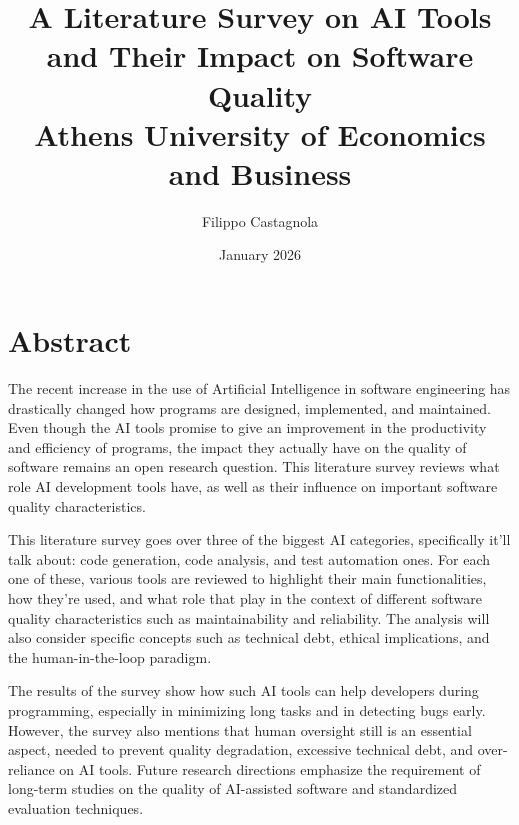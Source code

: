 \documentclass{report}
\title{\textbf{A Literature Survey on AI Tools and Their Impact on Software Quality}\\

{\Large Athens University of Economics and Business}}
\author{Filippo Castagnola}
\date{January 2026}
\begin{document}
\maketitle

\chapter*{Abstract}

The recent increase in the use of Artificial Intelligence in software engineering has drastically changed how programs are designed, implemented, and maintained. Even though the AI tools promise to give an improvement in the productivity and efficiency of programs, the impact they actually have on the quality of software remains an open research question. This literature survey reviews what role AI development tools have, as well as their influence on important software quality characteristics.

This literature survey goes over three of the biggest AI categories, specifically it'll talk about: code generation, code analysis, and test automation ones. For each one of these, various tools are reviewed to highlight their main functionalities, how they're used, and what role that play in the context of different software quality characteristics such as maintainability and reliability. The analysis will also consider specific concepts such as technical debt, ethical implications, and the human-in-the-loop paradigm.

The results of the survey show how such AI tools can help developers during programming, especially in minimizing long tasks and in detecting bugs early. However, the survey also mentions that human oversight still is an essential aspect, needed to prevent quality degradation, excessive technical debt, and over-reliance on AI tools. Future research directions emphasize the requirement of long-term studies on the quality of AI-assisted software and standardized evaluation techniques.

\tableofcontents



















\end{document}
